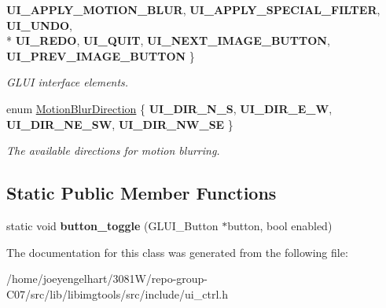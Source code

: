 \begin{DoxyCompactItemize}
{\bfseries U\+I\+\_\+\+A\+P\+P\+L\+Y\+\_\+\+M\+O\+T\+I\+O\+N\+\_\+\+B\+L\+UR}, 
{\bfseries U\+I\+\_\+\+A\+P\+P\+L\+Y\+\_\+\+S\+P\+E\+C\+I\+A\+L\+\_\+\+F\+I\+L\+T\+ER}, 
{\bfseries U\+I\+\_\+\+U\+N\+DO}, 
\\*
{\bfseries U\+I\+\_\+\+R\+E\+DO}, 
{\bfseries U\+I\+\_\+\+Q\+U\+IT}, 
{\bfseries U\+I\+\_\+\+N\+E\+X\+T\+\_\+\+I\+M\+A\+G\+E\+\_\+\+B\+U\+T\+T\+ON}, 
{\bfseries U\+I\+\_\+\+P\+R\+E\+V\+\_\+\+I\+M\+A\+G\+E\+\_\+\+B\+U\+T\+T\+ON}
 \}\hypertarget{classimage__tools_1_1UICtrl_a94c1180d7f5541b2d52d0f56ff6dfbd6}{}\label{classimage__tools_1_1UICtrl_a94c1180d7f5541b2d52d0f56ff6dfbd6}
\begin{DoxyCompactList}\small\item\em G\+L\+UI interface elements. \end{DoxyCompactList}
\item 
enum \hyperlink{classimage__tools_1_1UICtrl_a56d4f68bf91302769d7bc453d8d57cee}{Motion\+Blur\+Direction} \{ {\bfseries U\+I\+\_\+\+D\+I\+R\+\_\+\+N\+\_\+S}, 
{\bfseries U\+I\+\_\+\+D\+I\+R\+\_\+\+E\+\_\+W}, 
{\bfseries U\+I\+\_\+\+D\+I\+R\+\_\+\+N\+E\+\_\+\+SW}, 
{\bfseries U\+I\+\_\+\+D\+I\+R\+\_\+\+N\+W\+\_\+\+SE}
 \}\hypertarget{classimage__tools_1_1UICtrl_a56d4f68bf91302769d7bc453d8d57cee}{}\label{classimage__tools_1_1UICtrl_a56d4f68bf91302769d7bc453d8d57cee}
\begin{DoxyCompactList}\small\item\em The available directions for motion blurring. \end{DoxyCompactList}
\end{DoxyCompactItemize}
\subsection*{Static Public Member Functions}
\begin{DoxyCompactItemize}
\item 
static void {\bfseries button\+\_\+toggle} (G\+L\+U\+I\+\_\+\+Button $\ast$button, bool enabled)\hypertarget{classimage__tools_1_1UICtrl_ab69f0e1ea369485305d87820b61e1a50}{}\label{classimage__tools_1_1UICtrl_ab69f0e1ea369485305d87820b61e1a50}

\end{DoxyCompactItemize}


The documentation for this class was generated from the following file\+:\begin{DoxyCompactItemize}
\item 
/home/joeyengelhart/3081\+W/repo-\/group-\/\+C07/src/lib/libimgtools/src/include/ui\+\_\+ctrl.\+h\end{DoxyCompactItemize}

